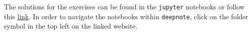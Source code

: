 \documentclass[a4paper]{article}
\begin{document}

The solutions for the exercises can be found in the \texttt{jupyter} notebooks or follow this \href{https://deepnote.com/workspace/gcskoenig-6b2d-6ada7063-1493-4564-97da-708dc68cc4ad/project/ex-fi-sol-249d1b8e-109f-4b94-b0ef-ed5d22171b28//utils.py}{link}. In order to navigate the notebooks within \texttt{deepnote}, click on the folder symbol in the top left on the linked website.


%



%


\dlz
\end{document}
